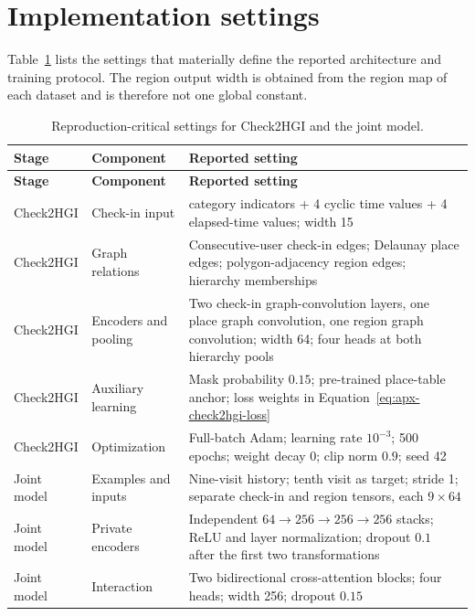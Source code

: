 \section{Implementation settings}
\label{sec:apx-methods-specification}

Table~\ref{tab:apx-active-settings} lists the settings that materially define the
reported architecture and training protocol. The region output width is obtained
from the region map of each dataset and is therefore not one global constant.

{\small
\begin{longtable}{>{\raggedright\arraybackslash}p{}
                  >{\raggedright\arraybackslash}p{}
                  >{\raggedright\arraybackslash}p{}}
\caption{Reproduction-critical settings for Check2HGI and the joint model.}
\label{tab:apx-active-settings}\\
\toprule
\textbf{Stage} & \textbf{Component} & \textbf{Reported setting} \\
\midrule
\endfirsthead
\toprule
\textbf{Stage} & \textbf{Component} & \textbf{Reported setting} \\
\midrule
\endhead
Check2HGI & Check-in input & 7 category indicators + 4 cyclic time values + 4 elapsed-time values; width 15 \\
Check2HGI & Graph relations & Consecutive-user check-in edges; Delaunay place edges; polygon-adjacency region edges; hierarchy memberships \\
Check2HGI & Encoders and pooling & Two check-in graph-convolution layers, one place graph convolution, one region graph convolution; width 64; four heads at both hierarchy pools \\
Check2HGI & Auxiliary learning & Mask probability $0.15$; pre-trained place-table anchor; loss weights in Equation~\ref{eq:apx-check2hgi-loss} \\
Check2HGI & Optimization & Full-batch Adam; learning rate $10^{-3}$; 500 epochs; weight decay 0; clip norm $0.9$; seed 42 \\
Joint model & Examples and inputs & Nine-visit history; tenth visit as target; stride 1; separate check-in and region tensors, each $9\times64$ \\
Joint model & Private encoders & Independent $64\rightarrow256\rightarrow256\rightarrow256$ stacks; ReLU and layer normalization; dropout $0.1$ after the first two transformations \\
Joint model & Interaction & Two bidirectional cross-attention blocks; four heads; width 256; dropout $0.15$ \\

\end{longtable}}
